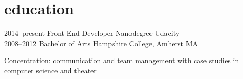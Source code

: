 \documentclass[]{friggeri-cv} %
\begin{document}

\section{education}

\begin{entrylist}
\entry
{2014--present}
{Front End Developer Nanodegree}{}
{Udacity}
\\
\entry
{2008--2012}
{Bachelor of Arts}{}
{Hampshire College, Amherst MA}

\entry
{\mediumitalic Concentration:}
{\normalfont communication and team management with case studies in computer science and theater}{}{}
\end{entrylist}
\end{document}
